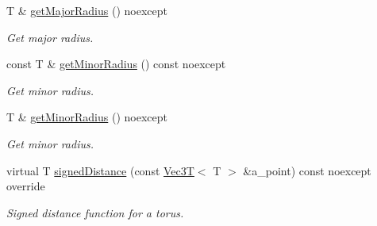 \begin{DoxyCompactItemize}
T \& \hyperlink{classTorusSDF_a81910ce83df61223ab3484c7de0747c7}{get\+Major\+Radius} () noexcept
\begin{DoxyCompactList}\small\item\em Get major radius. \end{DoxyCompactList}\item 
const T \& \hyperlink{classTorusSDF_a3af383d80c8d11ab9d39fc872d661a42}{get\+Minor\+Radius} () const noexcept
\begin{DoxyCompactList}\small\item\em Get minor radius. \end{DoxyCompactList}\item 
T \& \hyperlink{classTorusSDF_a0eff8ed5c429c6f80580c9660ac9cdfa}{get\+Minor\+Radius} () noexcept
\begin{DoxyCompactList}\small\item\em Get minor radius. \end{DoxyCompactList}\item 
virtual T \hyperlink{classTorusSDF_a23b4d455de2b7b9988ce81833ccd5302}{signed\+Distance} (const \hyperlink{classVec3T}{Vec3T}$<$ T $>$ \&a\+\_\+point) const noexcept override
\begin{DoxyCompactList}\small\item\em Signed distance function for a torus. \end{DoxyCompactList}\end{DoxyCompactItemize}
